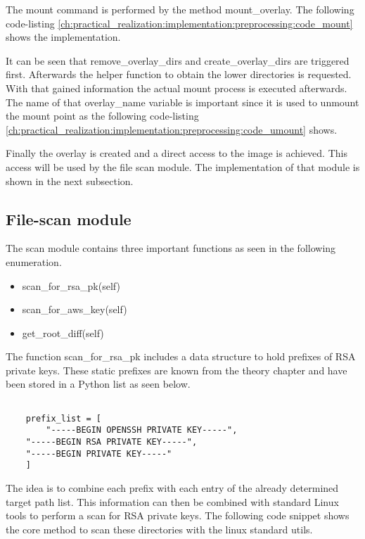 The mount command is performed by the method  mount\_overlay. The following code-listing \ref{ch:practical_realization:implementation:preprocessing:code_mount} shows the implementation.

It can be seen that remove\_overlay\_dirs and create\_overlay\_dirs are triggered first. 
Afterwards the helper function to obtain the lower directories is requested.
With that gained information the actual mount process is executed afterwards. 
The name of that overlay\_name variable is important since it is used to unmount the mount point as the following code-listing \ref{ch:practical_realization:implementation:preprocessing:code_umount} shows.


Finally the overlay is created and a direct access to the image is achieved. 
This access will be used by the file scan module. The implementation of that module is shown in the next subsection.

\subsection{File-scan module}
\label{ch:practical_realization:implementation:scan}
The scan module contains three important functions as seen in the following enumeration.
\begin{itemize}
\item scan\_for\_rsa\_pk(self)
\item scan\_for\_aws\_key(self)
\item get\_root\_diff(self)
\end{itemize}
The function scan\_for\_rsa\_pk includes a data structure to hold prefixes of RSA private keys.
These static prefixes are known from the theory chapter and have been stored in a Python list as seen below.
\lstset{language=Python}          
\begin{lstlisting}[]  % Start your code-block
	
    prefix_list = [
    	"-----BEGIN OPENSSH PRIVATE KEY-----",
	"-----BEGIN RSA PRIVATE KEY-----",
	"-----BEGIN PRIVATE KEY-----"
	]
\end{lstlisting}
The idea is to combine each prefix with each entry of the already determined target path list.
This information can then be combined with standard Linux tools to perform a scan for RSA private keys.
The following code snippet shows the core method to scan these directories with the linux standard utils.

